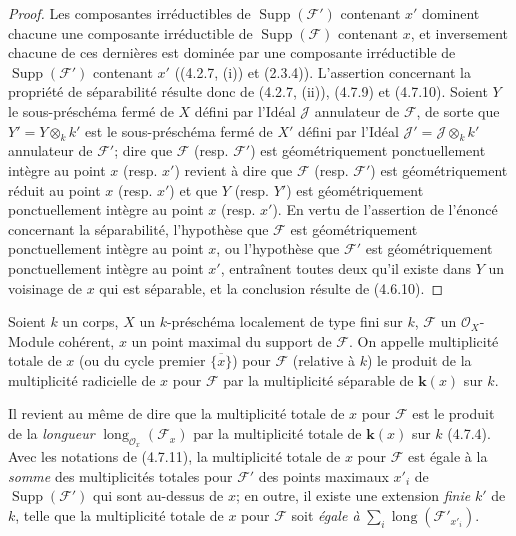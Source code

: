 \begin{proof}
Les composantes irréductibles de $\operatorname{Supp}(\mathscr F')$ contenant
$x'$ dominent chacune une composante irréductible de
$\operatorname{Supp}(\mathscr F)$ contenant $x$, et inversement chacune de
ces dernières est dominée par une composante irréductible de
$\operatorname{Supp}(\mathscr F')$ contenant $x'$ ((4.2.7, (i)) et (2.3.4)).
L'assertion concernant la propriété de séparabilité résulte donc de (4.2.7,
(ii)), (4.7.9) et (4.7.10). Soient $Y$ le sous-préschéma fermé de $X$ défini
par l'Idéal $\mathscr J$ annulateur de $\mathscr F$, de sorte que
$Y'=Y\otimes_k k'$ est le sous-préschéma fermé de $X'$ défini par l'Idéal
$\mathscr J'=\mathscr J\otimes_k k'$ annulateur de $\mathscr F'$; dire que
$\mathscr F$ (resp. $\mathscr F'$) est géométriquement ponctuellement intègre
au point $x$ (resp. $x'$) revient à dire que $\mathscr F$ (resp.
$\mathscr F'$) est géométriquement réduit au point $x$ (resp. $x'$) et que
$Y$ (resp. $Y'$) est géométriquement ponctuellement intègre au point $x$
(resp. $x'$). En vertu de l'assertion de l'énoncé concernant la séparabilité,
l'hypothèse que $\mathscr F$ est géométriquement ponctuellement intègre au
point $x$, ou l'hypothèse que $\mathscr F'$ est géométriquement ponctuellement
intègre au point $x'$, entraînent toutes deux qu'il existe dans $Y$ un
voisinage de $x$ qui est séparable, et la conclusion résulte de (4.6.10).
\end{proof}

\begin{definition}[4.7.12]
\label{IV.2.4.7.12-fr}
Soient $k$ un corps, $X$ un $k$-préschéma localement de type fini sur $k$,
$\mathscr F$ un $\mathcal O_X$-Module cohérent, $x$ un point maximal du
support de $\mathscr F$. On appelle multiplicité
totale de $x$ (ou du
cycle premier $\overline{\{x\}}$) pour $\mathscr F$ (relative à $k$) le
produit de la multiplicité radicielle de $x$ pour $\mathscr F$ par la
multiplicité séparable de $\boldsymbol{k}(x)$ sur $k$.
\end{definition}

Il revient au même de dire que la multiplicité totale de $x$ pour $\mathscr F$
est le produit de la \emph{longueur}
$\operatorname{long}_{\mathcal O_x}(\mathscr F_x)$ par la multiplicité totale
de $\boldsymbol{k}(x)$ sur $k$ (4.7.4). Avec les notations de (4.7.11), la multiplicité
totale de $x$ pour $\mathscr F$ est égale à la \emph{somme} des multiplicités totales
pour $\mathscr F'$ des points maximaux $x'_i$ de
$\operatorname{Supp}(\mathscr F')$ qui sont au-dessus de $x$; en outre, il
existe une extension \emph{finie} $k'$ de $k$, telle que la multiplicité totale de
$x$ pour $\mathscr F$ soit \emph{égale à}
$\sum_i\operatorname{long}(\mathscr F'_{x'_i})$.

